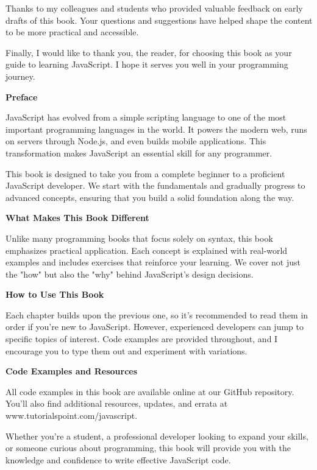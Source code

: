 \documentclass[12pt,a4paper,oneside]{book}
\begin{document}
Thanks to my colleagues and students who provided valuable feedback on early drafts of this book. Your questions and suggestions have helped shape the content to be more practical and accessible.

Finally, I would like to thank you, the reader, for choosing this book as your guide to learning JavaScript. I hope it serves you well in your programming journey.

\clearpage
\thispagestyle{empty}
\vspace*{2cm}
\begin{center}
    \large\bfseries Preface
\end{center}

\vspace{1cm}

JavaScript has evolved from a simple scripting language to one of the most important programming languages in the world. It powers the modern web, runs on servers through Node.js, and even builds mobile applications. This transformation makes JavaScript an essential skill for any programmer.

This book is designed to take you from a complete beginner to a proficient JavaScript developer. We start with the fundamentals and gradually progress to advanced concepts, ensuring that you build a solid foundation along the way.

\textbf{What Makes This Book Different}

Unlike many programming books that focus solely on syntax, this book emphasizes practical application. Each concept is explained with real-world examples and includes exercises that reinforce your learning. We cover not just the "how" but also the "why" behind JavaScript's design decisions.

\textbf{How to Use This Book}

Each chapter builds upon the previous one, so it's recommended to read them in order if you're new to JavaScript. However, experienced developers can jump to specific topics of interest. Code examples are provided throughout, and I encourage you to type them out and experiment with variations.

\textbf{Code Examples and Resources}

All code examples in this book are available online at our GitHub repository. You'll also find additional resources, updates, and errata at www.tutorialspoint.com/javascript.

Whether you're a student, a professional developer looking to expand your skills, or someone curious about programming, this book will provide you with the knowledge and confidence to write effective JavaScript code.
\end{document}

